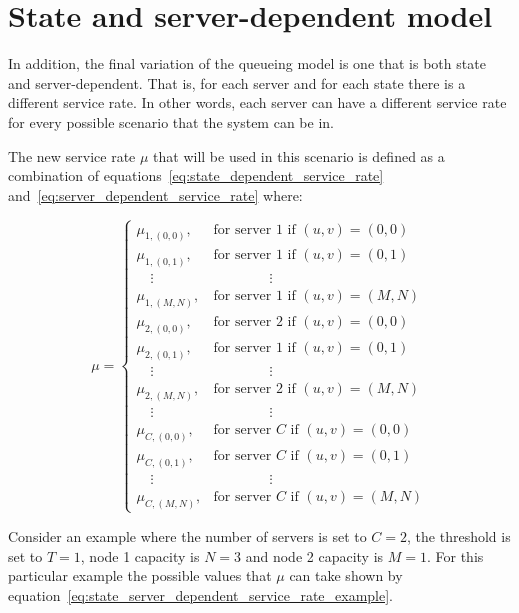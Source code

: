 \section{State and server-dependent model}\label{sec:state_server_dependent_model}

In addition, the final variation of the queueing model is one that is both
state and server-dependent.
That is, for each server and for each state there is a different service rate.
In other words, each server can have a different service rate for every
possible scenario that the system can be in.

The new service rate \(\mu\) that will be used in this scenario is defined as
a combination of equations~\eqref{eq:state_dependent_service_rate}
and~\eqref{eq:server_dependent_service_rate} where:

\begin{equation}\label{eq:state_server_dependent_service_rate}
    \mu =
    \begin{cases}
        \mu_{1, (0,0)}, & \text{for server } 1 \text{ if } (u, v) = (0, 0) \\
        \mu_{1, (0,1)}, & \text{for server } 1 \text{ if } (u, v) = (0, 1) \\
        \quad \vdots & \qquad \qquad \vdots \\
        \mu_{1, (M,N)}, & \text{for server } 1 \text{ if } (u, v) = (M, N) \\
        \mu_{2, (0,0)}, & \text{for server } 2 \text{ if } (u, v) = (0, 0) \\
        \mu_{2, (0,1)}, & \text{for server } 1 \text{ if } (u, v) = (0, 1) \\
        \quad \vdots & \qquad \qquad \vdots \\
        \mu_{2, (M,N)}, & \text{for server } 2 \text{ if } (u, v) = (M, N) \\
        \quad \vdots & \qquad \qquad \vdots \\
        \mu_{C, (0,0)}, & \text{for server } C \text{ if } (u, v) = (0, 0) \\
        \mu_{C, (0,1)}, & \text{for server } C \text{ if } (u, v) = (0, 1) \\
        \quad \vdots & \qquad \qquad \vdots \\
        \mu_{C, (M,N)}, & \text{for server } C \text{ if } (u, v) = (M, N)
    \end{cases}
\end{equation}

Consider an example where the number of servers is set to \(C = 2\), the
threshold is set to \(T = 1\), node 1 capacity is \(N = 3\) and node 2 capacity
is \(M = 1\).
For this particular example the possible values that \(\mu\) can take shown
by equation~\eqref{eq:state_server_dependent_service_rate_example}.

